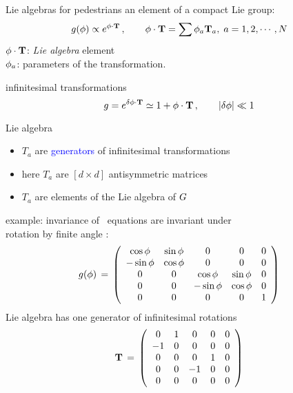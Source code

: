 \begin{frame}{Lie algebras for pedestrians}
an element of a compact Lie group:
\[
\LieEl(\gSpace) \propto e^{\gSpace \cdot \Lg }
	\,,\qquad
\gSpace \cdot \Lg  = \sum \gSpace_a \Lg_a,\; a=1,2, \cdots, N
\] %
$\gSpace \cdot \Lg$: {\em Lie algebra} element
\\
$\gSpace_a$: parameters of the transformation.

\bigskip
\begin{block}{infinitesimal transformations}
\[
g=e^{\delta \gSpace \cdot \Lg}
 \simeq  1 + \gSpace \cdot \Lg \,, \qquad \vert \delta \gSpace \vert \ll 1
\]
\end{block}
\begin{block}{Lie algebra}
\begin{itemize}
  \item $T_a$ are \textcolor{blue}{generators} of infinitesimal
transformations
  \item here $T_a$ are $[d\!\times\!d]$ antisymmetric matrices
  \item $T_a$ are elements of the Lie algebra of $\Group$
\end{itemize}
\end{block}
\end{frame}

\begin{frame}{example:  invariance of \cLe}
\cLe\ equations are invariant under
\\
 rotation by finite angle \gSpace:
\[
\LieEl(\gSpace) \,=\,  \left(\barr{ccccc}
  \cos \gSpace  & \sin \gSpace  & 0 & 0 & 0 \\
 -\sin \gSpace  & \cos \gSpace  & 0 & 0 & 0 \\
 0 & 0 &  \cos \gSpace & \sin \gSpace   & 0 \\
 0 & 0 & -\sin \gSpace & \cos \gSpace   & 0 \\
 0 & 0 & 0             & 0              & 1
    \earr\right)
\] %
 Lie algebra has one generator
of infinitesimal rotations
\[
 \Lg \,=\,   \left(\barr{ccccc}
    0  &  1 & 0  &  0 & 0  \\
   -1  &  0 & 0  &  0 & 0 \\
    0  &  0 & 0  &  1 & 0  \\
    0  &  0 &-1  &  0 & 0 \\
    0  &  0 & 0  &  0 & 0
    \earr\right)
\] %
\end{frame}

